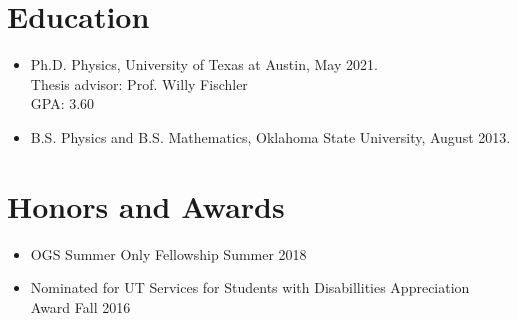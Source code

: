 \section*{Education}

\begin{itemize}

\item Ph.D. Physics, University of Texas at Austin, \hfill  May 2021.\\
  Thesis advisor: Prof. Willy Fischler\\
  GPA: 3.60
  
  
  \item B.S. Physics and B.S. Mathematics, Oklahoma State University, \hfill August 2013.\\

\end{itemize}

\section*{Honors and Awards}
\begin{itemize} \itemsep1pt \parskip0pt 

\item OGS Summer Only Fellowship \hfill{Summer 2018}

\item Nominated for UT Services for Students with Disabillities Appreciation Award \hfill{Fall 2016}

\end{itemize}

